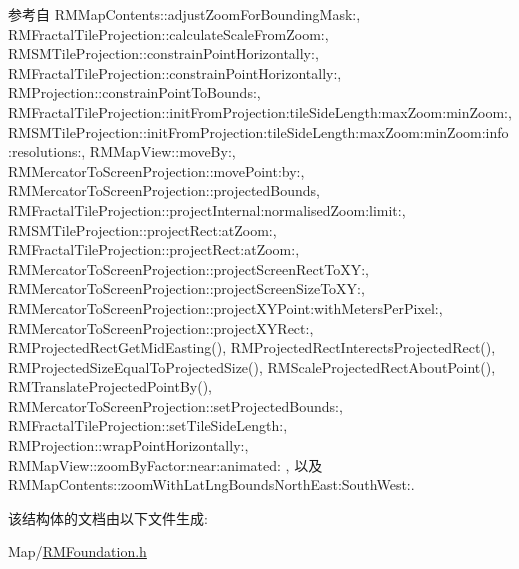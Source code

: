 参考自 R\-M\-Map\-Contents\-::adjust\-Zoom\-For\-Bounding\-Mask\-:, R\-M\-Fractal\-Tile\-Projection\-::calculate\-Scale\-From\-Zoom\-:, R\-M\-S\-M\-Tile\-Projection\-::constrain\-Point\-Horizontally\-:, R\-M\-Fractal\-Tile\-Projection\-::constrain\-Point\-Horizontally\-:, R\-M\-Projection\-::constrain\-Point\-To\-Bounds\-:, R\-M\-Fractal\-Tile\-Projection\-::init\-From\-Projection\-:tile\-Side\-Length\-:max\-Zoom\-:min\-Zoom\-:, R\-M\-S\-M\-Tile\-Projection\-::init\-From\-Projection\-:tile\-Side\-Length\-:max\-Zoom\-:min\-Zoom\-:info\-:resolutions\-:, R\-M\-Map\-View\-::move\-By\-:, R\-M\-Mercator\-To\-Screen\-Projection\-::move\-Point\-:by\-:, R\-M\-Mercator\-To\-Screen\-Projection\-::projected\-Bounds, R\-M\-Fractal\-Tile\-Projection\-::project\-Internal\-:normalised\-Zoom\-:limit\-:, R\-M\-S\-M\-Tile\-Projection\-::project\-Rect\-:at\-Zoom\-:, R\-M\-Fractal\-Tile\-Projection\-::project\-Rect\-:at\-Zoom\-:, R\-M\-Mercator\-To\-Screen\-Projection\-::project\-Screen\-Rect\-To\-X\-Y\-:, R\-M\-Mercator\-To\-Screen\-Projection\-::project\-Screen\-Size\-To\-X\-Y\-:, R\-M\-Mercator\-To\-Screen\-Projection\-::project\-X\-Y\-Point\-:with\-Meters\-Per\-Pixel\-:, R\-M\-Mercator\-To\-Screen\-Projection\-::project\-X\-Y\-Rect\-:, R\-M\-Projected\-Rect\-Get\-Mid\-Easting(), R\-M\-Projected\-Rect\-Interects\-Projected\-Rect(), R\-M\-Projected\-Size\-Equal\-To\-Projected\-Size(), R\-M\-Scale\-Projected\-Rect\-About\-Point(), R\-M\-Translate\-Projected\-Point\-By(), R\-M\-Mercator\-To\-Screen\-Projection\-::set\-Projected\-Bounds\-:, R\-M\-Fractal\-Tile\-Projection\-::set\-Tile\-Side\-Length\-:, R\-M\-Projection\-::wrap\-Point\-Horizontally\-:, R\-M\-Map\-View\-::zoom\-By\-Factor\-:near\-:animated\-: , 以及 R\-M\-Map\-Contents\-::zoom\-With\-Lat\-Lng\-Bounds\-North\-East\-:\-South\-West\-:.



该结构体的文档由以下文件生成\-:\begin{DoxyCompactItemize}
\item 
Map/\hyperlink{_r_m_foundation_8h}{R\-M\-Foundation.\-h}\end{DoxyCompactItemize}
